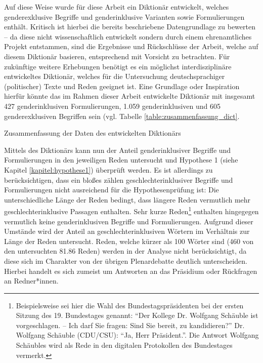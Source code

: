 \documentclass[12pt, 
    twoside=false, 
    bibliography=totoc, 
    numbers=endperiod, 
    headings=normal, 
    toc=chapterentrydotfill
    ]{scrbook}
\begin{document}
Auf diese Weise wurde für diese Arbeit ein Diktionär entwickelt, welches genderexklusive Begriffe und genderinklusive Varianten sowie Formulierungen enthält. Kritisch ist hierbei die bereits beschriebene Datengrundlage zu bewerten -- da diese nicht wissenschaftlich entwickelt sondern durch einem ehrenamtliches Projekt entstammen, sind die Ergebnisse und Rückschlüsse der Arbeit, welche auf diesem Diktionär basieren, entsprechend mit Vorsicht zu betrachten.
Für zukünftige weitere Erhebungen benötigt es ein möglichst interdisziplinäre entwickeltes Diktionär, welches für die Untersuchung deutschsprachiger (politischer) Texte und Reden geeignet ist. Eine Grundlage oder Inspiration hierfür könnte das im Rahmen dieser Arbeit entwickelte Diktionär mit insgesamt 427 genderinklusiven Formulierungen, 1.059 genderinklusiven und 605 genderexklusiven Begriffen sein (vgl. Tabelle \ref{table:zusammenfassung_dict}.

\begin{table}[htb]
    \centering
    \caption[Zusammenfassung der Daten des entwickelten Diktionärs]{Zusammenfassung der Daten des entwickelten Diktionärs}
    
    \label{table:zusammenfassung_dict}
\end{table}

Mittels des Diktionärs kann nun der Anteil genderinklusiver Begriffe und Formulierungen in den jeweiligen Reden untersucht und Hypothese 1 (siehe Kapitel \ref{kapitel:hypothese1}) überprüft werden. Es ist allerdings zu berücksichtigen, dass ein bloßes zählen geschlechterinklusiver Begriffe und Formulierungen nicht ausreichend für die Hypothesenprüfung ist:
Die unterschiedliche Länge der Reden bedingt, dass längere Reden vermutlich mehr geschlechterinklusive Passagen enthalten. Sehr kurze Reden\footnote{Beispielsweise sei hier die Wahl des Bundestagspräsidenten bei der ersten Sitzung des 19. Bundestages genannt: \enquote{Der Kollege Dr. Wolfgang Schäuble ist vorgeschlagen. – Ich darf Sie fragen: Sind Sie bereit, zu kandidieren?} Dr. Wolfgang Schäuble (CDU/CSU): \enquote{Ja, Herr Präsident.}. Die Antwort Wolfgang Schäubles wird als Rede in den digitalen Protokollen des Bundestages vermerkt.} enthalten hingegegen vermutlich keine genderinklusiven Begriffe und Formulierungen. Aufgrund dieser Umstände wird der Anteil an geschlechterinklusiven Wörtern im Verhältnis zur Länge der Reden untersucht. 
Reden, welche kürzer als 100 Wörter sind (460 von den untersuchten 81.86 Reden) werden in der Analyse nicht berücksichtigt, da diese sich im Charakter von der übrigen Plenardebatte deutlich unterscheiden. Hierbei handelt es sich zumeist um Antworten an das Präsidium oder Rückfragen an Redner*innen.
\end{document}
